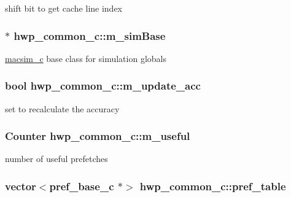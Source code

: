 \label{classhwp__common__c_ad38f322721c4ef2c6d2780966c726b03}
shift bit to get cache line index \hypertarget{classhwp__common__c_aea3fc85931e5d425eb8c7a60f39aa7fe}{
\subsubsection[{m\_\-simBase}]{$\ast$ {\bf hwp\_\-common\_\-c::m\_\-simBase}}}
\label{classhwp__common__c_aea3fc85931e5d425eb8c7a60f39aa7fe}
\hyperlink{classmacsim__c}{macsim\_\-c} base class for simulation globals \hypertarget{classhwp__common__c_abf0978a3089ddcee91a153cd2bb547bc}{
\subsubsection[{m\_\-update\_\-acc}]{\setlength{\rightskip}{0pt plus 5cm}bool {\bf hwp\_\-common\_\-c::m\_\-update\_\-acc}}}
\label{classhwp__common__c_abf0978a3089ddcee91a153cd2bb547bc}
set to recalculate the accuracy \hypertarget{classhwp__common__c_ad6cc891ec48a9d169da339e4c234a780}{
\subsubsection[{m\_\-useful}]{\setlength{\rightskip}{0pt plus 5cm}Counter {\bf hwp\_\-common\_\-c::m\_\-useful}}}
\label{classhwp__common__c_ad6cc891ec48a9d169da339e4c234a780}
number of useful prefetches \hypertarget{classhwp__common__c_aaad4b27dd21568522b666a86f953a6f3}{
\subsubsection[{pref\_\-table}]{\setlength{\rightskip}{0pt plus 5cm}vector$<${\bf pref\_\-base\_\-c} $\ast$$>$ {\bf hwp\_\-common\_\-c::pref\_\-table}}}
